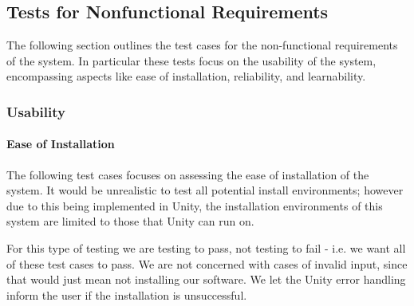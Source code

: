 \documentclass[12pt, titlepage]{article}
\begin{document}
\subsection{Tests for Nonfunctional Requirements}
The following section outlines the test cases for the non-functional 
requirements of the system. In particular these tests focus on the usability of 
the system, encompassing aspects like ease of installation, reliability, and 
learnability.
%
%

\subsubsection{Usability}
\paragraph{Ease of Installation}
The following test cases focuses on assessing the ease of installation of the 
system. It would be unrealistic to test all potential install environments; 
however due to this being implemented in Unity, the installation environments 
of this system are limited to those that Unity can run on.

For this type of testing we are testing to pass, not testing to fail - i.e. we 
want all of these test cases to pass. We are not concerned with cases of 
invalid input, since that would just mean not installing our software. We let 
the Unity error handling inform the user if the installation is unsuccessful.
\end{document}
